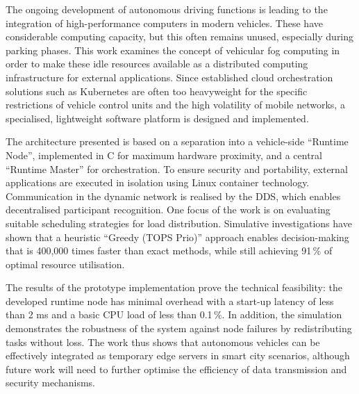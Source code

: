 The ongoing development of autonomous driving functions is leading to the integration of high-performance computers in modern vehicles. These have considerable computing capacity, but this often remains unused, especially during parking phases. This work examines the concept of vehicular fog computing in order to make these idle resources available as a distributed computing infrastructure for external applications. Since established cloud orchestration solutions such as Kubernetes are often too heavyweight for the specific restrictions of vehicle control units and the high volatility of mobile networks, a specialised, lightweight software platform is designed and implemented.

The architecture presented is based on a separation into a vehicle-side \enquote{Runtime Node}, implemented in C for maximum hardware proximity, and a central \enquote{Runtime Master} for orchestration. To ensure security and portability, external applications are executed in isolation using Linux container technology. Communication in the dynamic network is realised by the \gls{DDS}, which enables decentralised participant recognition. One focus of the work is on evaluating suitable scheduling strategies for load distribution. Simulative investigations have shown that a heuristic \enquote{Greedy (TOPS Prio)} approach enables decision-making that is 400,000 times faster than exact methods, while still achieving 91\,\% of optimal resource utilisation.

The results of the prototype implementation prove the technical feasibility: the developed runtime node has minimal overhead with a start-up latency of less than 2 ms and a basic CPU load of less than 0.1\,\%. In addition, the simulation demonstrates the robustness of the system against node failures by redistributing tasks without loss. The work thus shows that autonomous vehicles can be effectively integrated as temporary edge servers in smart city scenarios, although future work will need to further optimise the efficiency of data transmission and security mechanisms.
